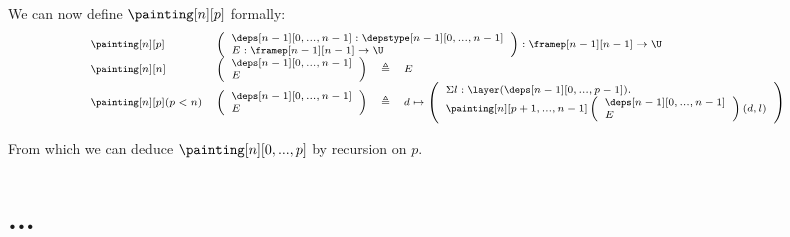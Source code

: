\documentclass{msc}
\newcommand{\defeq}{\ensuremath{\triangleq}}
\begin{document}
We can now define $\painting[n][p]$ formally:
\begin{equation*}
  \fontsize{7.2}{9}\selectfont
  \begin{array}{llcl}
    \painting[n][p]          &
    \multicolumn{3}{l}{
      \left(\begin{array}{l}
                \deps[n-1][0,...,n-1]:\depstype[n-1][0,...,n-1] \\
                E:\framep[n-1][n-1]\rightarrow \U               \\
              \end{array}\right) : \framep[n-1][n-1]\rightarrow \U
    }                                                            \\
    \painting[n][n]          &
    \left(\begin{array}{l}
              \deps[n-1][0,...,n-1] \\
              E                     \\
            \end{array}\right) & \defeq & E                        \\
    \painting[n][p](p<n)     &
    \left(\begin{array}{l}
              \deps[n-1][0,...,n-1] \\
              E                     \\
            \end{array}\right) & \defeq & d \mapsto
    \left(\begin{array}{l}
              \Sigma l:\layer(\deps[n-1][0,...,p-1]). \\
              \painting[n][p+1,...,n-1]
              \left(\begin{array}{l}
                  \deps[n-1][0,...,n-1] \\
                  E                     \\
                \end{array}\right)(d,l)           \\
            \end{array}\right) \\
  \end{array}
\end{equation*}

From which we can deduce $\painting[n][0,...,p]$ by recursion on $p$.

\section{...}
\end{document}
